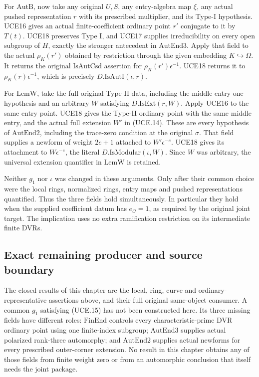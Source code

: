 \documentclass[11pt,a4paper]{article}
\numberwithin{equation}{section}
\theoremstyle{remark}\newtheorem{remark}[theorem]{Remark}
\begin{document}
For \(\mathrm{AutB}\), now take any original \(U,S\), any
entry-algebra map \(\xi\), any actual pushed representation
\(r\) with its prescribed multiplier, and its Type-I hypothesis.
UCE16 gives an actual finite-coefficient ordinary point \(r'\)
conjugate to it by \(T(t)\).  UCE18 preserves Type I, and
UCE17 supplies irreducibility on every open subgroup of
\(H\), exactly the stronger antecedent in
\(\mathrm{AutEnd3}\).  Apply that field to the actual
\(\rho_K(r')\) obtained by restriction through the given
embedding \(K\hookrightarrow\Omega\).  It returns the original
\(\mathrm{IsAutCsd}\) assertion for
\(\rho_K(r')\epsilon^{-1}\).  UCE18 returns it to
\(\rho_K(r)\epsilon^{-1}\), which is precisely
\(D.\mathrm{IsAutI}(\iota,r)\).

For \(\mathrm{LemW}\), take the full original Type-II data,
including the middle-entry-one hypothesis and an arbitrary
\(W\) satisfying \(D.\mathrm{IsExt}(r,W)\).  Apply UCE16
to the same entry point.  UCE18 gives the Type-II ordinary
point with the same middle entry, and the actual full extension
\(W'\) in (UCE.14).  These are every hypothesis of
\(\mathrm{AutEnd2}\), including the trace-zero condition at
the original \(\sigma\).  That field supplies a newform of
weight \(2e+1\) attached to \(W'\epsilon^{-e}\).
UCE18 gives its attachment to \(W\epsilon^{-e}\), the literal
\(D.\mathrm{IsModular}(\iota,W)\).  Since \(W\) was arbitrary,
the universal extension quantifier in \(\mathrm{LemW}\) is retained.

Neither \(g_1\) nor \(\iota\) was changed in these arguments.
Only after their common choice were the local rings, normalized
rings, entry maps and pushed representations quantified.  Thus
the three fields hold simultaneously.  In particular they hold
when the supplied coefficient datum has \(e_{\mathcal O}=1\),
as required by the original joint target.  The implication uses
no extra ramification restriction on its intermediate finite DVRs.

\subsection{Exact remaining producer and source boundary}

The closed results of this chapter are the local, ring, curve and
ordinary-representative assertions above, and their full original
same-object consumer.  A common \(g_1\) satisfying (UCE.15) has
not been constructed here.  Its three missing fields have different
roles: \(\mathrm{FinEnd}\) controls every characteristic-prime DVR
ordinary point using one finite-index subgroup; \(\mathrm{AutEnd3}\)
supplies actual polarized rank-three automorphy; and
\(\mathrm{AutEnd2}\) supplies actual newforms for every prescribed
outer-corner extension.  No result in this chapter obtains any of
those fields from finite weight zero or from an automorphic conclusion
that itself needs the joint package.
\end{document}
